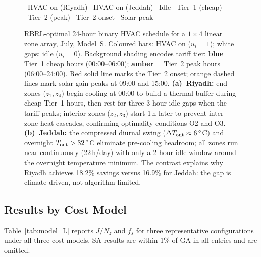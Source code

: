 \documentclass[12pt,a4paper]{article}
\let\oldsubsection\subsection
\renewcommand{\subsection}[1]{\FloatBarrier\oldsubsection{#1}}
\newcommand{\Jbar}{\bar{J}}
\begin{document}
\begin{figure}[!t]
\vspace{3pt}
\begin{center}
\small
{}~HVAC on (Riyadh)\enspace
{}~HVAC on (Jeddah)\enspace
{}~Idle\enspace
{}~Tier~1 (cheap)\enspace
{}~Tier~2 (peak)\enspace
{}~Tier~2 onset\enspace
{}~Solar peak
\end{center}
\caption{RBRL-optimal 24-hour binary HVAC schedule for a $1\!\times\!4$
linear zone array, July, Model~S.
Coloured bars: HVAC on ($u_i=1$); white gaps: idle ($u_i=0$).
Background shading encodes tariff tier: \textbf{blue} = Tier~1 cheap
hours (00:00--06:00); \textbf{amber} = Tier~2 peak hours (06:00--24:00).
Red solid line marks the Tier~2 onset; orange dashed lines mark solar gain
peaks at 09:00 and 15:00.
\textbf{(a)~Riyadh:}
end zones ($z_1, z_4$) begin cooling at 00:00 to build a thermal buffer
during cheap Tier~1 hours, then rest for three 3-hour idle gaps when the
tariff peaks; interior zones ($z_2, z_3$) start 1\,h later to prevent
inter-zone heat cascades, confirming optimality conditions O2 and O3.
\textbf{(b)~Jeddah:}
the compressed diurnal swing ($\Delta T_{\rm out}\approx6\,^\circ$C$)$ and
overnight $T_{\rm out}>32\,^\circ$C eliminate pre-cooling headroom;
all zones run near-continuously (22\,h/day) with only a 2-hour idle
window around the overnight temperature minimum.
The contrast explains why Riyadh achieves 18.2\% savings versus 16.9\%
for Jeddah: the gap is climate-driven, not algorithm-limited.}
\label{fig:gantt}
\end{figure}


\subsection{Results by Cost Model}
\label{subsec:res_all}

Table~\ref{tab:model_L} reports $\Jbar/N_z$ and $f_s$ for three
representative configurations under all three cost models.
SA results are within 1\% of GA in all entries and are omitted.
\end{document}
